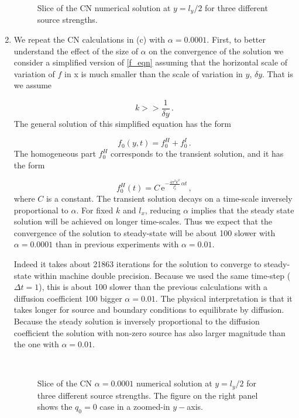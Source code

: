 \documentclass[11pt]{article}
\newcommand{\ee}{\mathrm{e}}
\newcommand{\com}{\, ,}
\newcommand{\per}{\, .}
\def\beq{\begin{equation}}
\def\eeq{\end{equation}}
\begin{document}
\begin{enumerate}[label=(\alph*)]
        \begin{figure}[p]
        \centerline{}
        \caption{Slice of the CN numerical solution at $y=l_y/2$ for three different source strengths.}
        \label{soln_cn}
        \end{figure}



    \item We repeat the CN calculations in (c) with $\alpha = 0.0001$. First, to better understand the effect of the size of $\alpha$ on the convergence of the solution we consider a simplified version of \eqref{f_eqn} assuming that the horizontal scale of variation of $f$ in x is much smaller than the scale of variation in $y$, $\delta y$. That is we assume

        \beq
            k >> \frac{1}{\delta y}\per
        \eeq
        The general solution of this simplified equation has the  form

        \beq
            \label{general_soln}
            f_0(y,t) = f_0^H + f_0^I\per
        \eeq
        The homogeneous part $f_0^H$ corresponds to the transient solution, and it has the form

        \beq
        f_0^H(t) = C\,\ee^{-\tfrac{4\pi^2k^2}{l_x^2}\,\alpha t}\com
        \eeq
        where $C$ is a constant. The transient solution decays on a time-scale inversely proportional to $\alpha$. For fixed $k$ and $l_x$, reducing $\alpha$ implies that the steady state solution will be achieved on longer time-scales. Thus we expect that the convergence of the solution to steady-state will be about 100 slower  with $\alpha=0.0001$ than in previous experiments with $\alpha=0.01$. 

        Indeed it takes about 21863 iterations for the solution to converge to steady-state within machine double precision. Because we used the same time-step ($\Delta t =1$), this is about 100 slower than the previous calculations with a diffusion coefficient 100 bigger $\alpha = 0.01$. The physical interpretation is that it takes longer for source and boundary conditions to equilibrate by diffusion. Because the steady solution is inversely proportional to the diffusion coefficient the solution with non-zero source has also larger magnitude than the one with $\alpha=0.01$. 

        \begin{figure}[p]
        \centerline{\\
        }
        \caption{Slice of the CN $\alpha=0.0001$ numerical solution at $y=l_y/2$ for three different source strengths. The figure on the right panel shows the $q_0=0$ case in a zoomed-in $y-$axis.}
        \label{soln_cn}
        \end{figure}



\end{enumerate}
\end{document}
